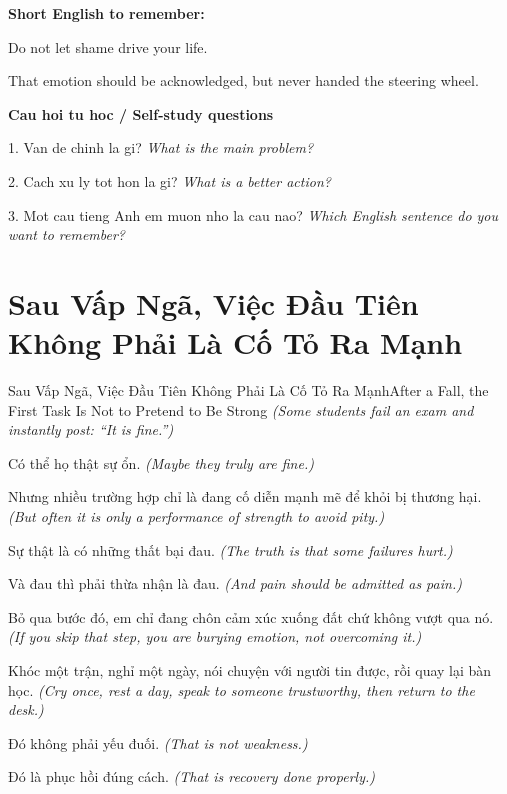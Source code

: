 \begin{ghinhoanh}
\textbf{Short English to remember:}

Do not let shame drive your life.

That emotion should be acknowledged, but never handed the steering wheel.

\end{ghinhoanh}

\begin{tuhocnhanh}
\textbf{Cau hoi tu hoc / Self-study questions}

1. Van de chinh la gi? \textit{What is the main problem?}

2. Cach xu ly tot hon la gi? \textit{What is a better action?}

3. Mot cau tieng Anh em muon nho la cau nao? \textit{Which English sentence do you want to remember?}
\end{tuhocnhanh}
\ngancach

\section{Sau Vấp Ngã, Việc Đầu Tiên Không Phải Là Cố Tỏ Ra Mạnh}
\begin{truyen}{Sau Vấp Ngã, Việc Đầu Tiên Không Phải Là Cố Tỏ Ra Mạnh}{After a Fall, the First Task Is Not to Pretend to Be Strong}
\textit{(Some students fail an exam and instantly post: ``It is fine.'')}

Có thể họ thật sự ổn.
\textit{(Maybe they truly are fine.)}

Nhưng nhiều trường hợp chỉ là đang cố diễn mạnh mẽ để khỏi bị thương hại.
\textit{(But often it is only a performance of strength to avoid pity.)}

Sự thật là có những thất bại đau.
\textit{(The truth is that some failures hurt.)}

Và đau thì phải thừa nhận là đau.
\textit{(And pain should be admitted as pain.)}

Bỏ qua bước đó, em chỉ đang chôn cảm xúc xuống đất chứ không vượt qua nó.
\textit{(If you skip that step, you are burying emotion, not overcoming it.)}

Khóc một trận, nghỉ một ngày, nói chuyện với người tin được, rồi quay lại bàn học.
\textit{(Cry once, rest a day, speak to someone trustworthy, then return to the desk.)}

Đó không phải yếu đuối.
\textit{(That is not weakness.)}

Đó là phục hồi đúng cách.
\textit{(That is recovery done properly.)}

\end{truyen}

